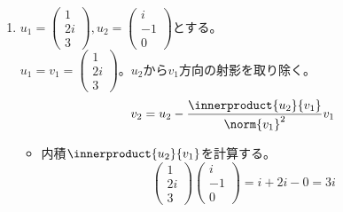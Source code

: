 \begin{souanswer}
\begin{enumerate}
	\item $u_1= \begin{pmatrix}1\\ 2i\\ 3\end{pmatrix}, u_2= \begin{pmatrix}i\\ -1\\ 0\end{pmatrix}$とする。\\
	$u_1= v_1= \begin{pmatrix}1\\ 2i\\ 3\end{pmatrix}$。$u_2$から$v_1$方向の射影を取り除く。
\begin{equation*}
	v_2= u_2- \frac{\innerproduct{u_2}{v_1}}{\norm{v_1}^2}v_1
\end{equation*}
\begin{itemize}
	\item 内積$\innerproduct{u_2}{v_1}$を計算する。
\begin{equation*}
	\begin{pmatrix}1\\ 2i\\ 3\end{pmatrix}\begin{pmatrix}i\\ -1\\ 0\end{pmatrix}= i+ 2i- 0= 3i
\end{equation*}


\end{itemize}
\end{enumerate}
\end{souanswer}
